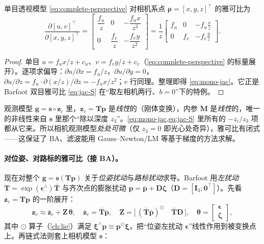 \begin{theorem}[单目投影雅可比]\label{thm:mono-jac}
单目透视模型 \cref{eq:complete-perspective} 对相机系点 $\boldsymbol\rho=[x,y,z]^\top$ 的雅可比为
\begin{equation}
  \frac{\partial[u,v]^\top}{\partial[x,y,z]^\top}
  =\begin{bmatrix}\dfrac{f_u}{z}&0&-\dfrac{f_u x}{z^2}\\[2mm]0&\dfrac{f_v}{z}&-\dfrac{f_v y}{z^2}\end{bmatrix}
  =\frac1z\begin{bmatrix}f_u&0&-f_u\tfrac{x}{z}\\0&f_v&-f_v\tfrac{y}{z}\end{bmatrix}.
  \label{eq:mono-jac}
\end{equation}
\end{theorem}
\begin{proof}
单目 $u=f_u x/z+c_u$、$v=f_v y/z+c_v$（\cref{eq:complete-perspective} 的标量展开）。逐项求偏导：$\partial u/\partial x=f_u/z$，$\partial u/\partial y=0$，$\partial u/\partial z=f_u\cdot\partial(x/z)/\partial z=-f_u x/z^2$；$v$ 行同理。整理即得 \cref{eq:mono-jac}。它正是 Barfoot 双目雅可比 \cref{eq:jac-S} 在“取左相机两行、$b=0$”下的特例\cite{barfoot2024state}。
\end{proof}

\begin{insight}[透视除法是唯一的非线性来源]
观测模型 $\mathbf{g}=\mathbf{s}\circ\mathbf{z}_c$ 里，$\mathbf{z}_c=\mathbf{T}\mathbf{p}$ 是\emph{线性}的（刚体变换），内参 $\mathbf{M}$ 是\emph{线性}的，唯一的非线性来自 $\mathbf{s}$ 里那个“除以深度 $z_3$”。\cref{eq:mono-jac,eq:jac-S} 里所有的 $-z_i/z_3$ 项都从它来。所以相机观测模型\emph{处处可微}（仅 $z_3=0$ 即光心处奇异），雅可比有闭式——这保证了 BA、滤波能用 Gauss--Newton/LM 等基于梯度的方法求解。
\end{insight}

\paragraph{对位姿、对路标的雅可比（接 BA）。}
现在对整个 $\mathbf{g}=\mathbf{s}(\mathbf{T}\mathbf{p})$ 关于\emph{位姿扰动}与\emph{路标扰动}求导。Barfoot 用\emph{左扰动} $\mathbf{T}=\exp(\boldsymbol\epsilon^\wedge)\bar{\mathbf{T}}$ 与齐次点的膨胀扰动 $\mathbf{p}=\bar{\mathbf{p}}+\mathbf{D}\boldsymbol\zeta$（$\mathbf{D}=[\mathbf{I}_3;\mathbf{0}^\top]$）\cite{barfoot2024state}。先看 $\mathbf{z}_c=\mathbf{T}\mathbf{p}$ 的一阶展开：
\begin{equation}
  \mathbf{z}_c\approx\bar{\mathbf{z}}_c+\mathbf{Z}\,\boldsymbol\theta,\quad
  \bar{\mathbf{z}}_c=\bar{\mathbf{T}}\bar{\mathbf{p}},\quad
  \mathbf{Z}=\big[\,(\bar{\mathbf{T}}\bar{\mathbf{p}})^{\odot}\quad \bar{\mathbf{T}}\mathbf{D}\,\big],\quad
  \boldsymbol\theta=\begin{bmatrix}\boldsymbol\epsilon\\\boldsymbol\zeta\end{bmatrix},
  \label{eq:z-expand}
\end{equation}
其中 $\odot$ 算子（\cref{ch:lie}）满足 $\boldsymbol\xi^\wedge\mathbf{p}\equiv\mathbf{p}^\odot\boldsymbol\xi$，把“位姿左扰动 $\boldsymbol\epsilon$”线性作用到被变换点上。再链式法则套上相机模型 $\mathbf{s}$：

